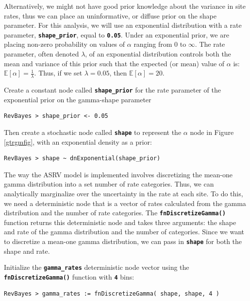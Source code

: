 \documentclass[11pt]{article}
\newcommand{\cl}[1]{{\texttt{\textbf{#1}}}}
\begin{document}
Alternatively, we might not have good prior knowledge about the variance in site rates, thus we can place an uninformative, or diffuse prior on the shape parameter.
For this analysis, we will use an exponential distribution with a rate parameter, \cl{shape\_prior}, equal to \cl{0.05}.
Under an exponential prior, we are placing non-zero probability on values of $\alpha$ ranging from 0 to $\infty$. 
The rate parameter, often denoted $\lambda$, of an exponential distribution controls both the mean and variance of this prior such that the expected (or mean) value of $\alpha$ is:
$\mathbb{E}[\alpha] = \frac{1}{\lambda}.$
Thus, if we set $\lambda=0.05$, then $\mathbb{E}[\alpha] = 20$.

Create a constant node called \cl{shape\_prior} for the rate parameter of the exponential prior on the gamma-shape parameter
{\tt\begin{snugshade*}
\begin{lstlisting}
RevBayes > shape_prior <- 0.05                                                                             
\end{lstlisting}
\end{snugshade*}}

Then create a stochastic node called \cl{shape} to represent the $\alpha$ node in Figure \ref{gtrgmfig}, with an exponential density as a prior:
{\tt\begin{snugshade*}
\begin{lstlisting}
RevBayes > shape ~ dnExponential(shape_prior)

\end{lstlisting}
\end{snugshade*}}

The way the ASRV model is implemented involves discretizing the mean-one gamma distribution into a set number of rate categories. Thus, we can analytically marginalize over the uncertainty in the rate at each site. To do this, we need a deterministic node that is a vector of rates calculated from the gamma distribution and the number of rate categories. The \cl{fnDiscretizeGamma()} function returns this deterministic node and takes three arguments: the shape and rate of the gamma distribution and the number of categories. Since we want to discretize a mean-one gamma distribution, we can pass in \cl{shape} for both the shape and rate.

Initialize the \cl{gamma\_rates} deterministic node vector using the  \cl{fnDiscretizeGamma()} function with \cl{4} bins:
{\tt \begin{snugshade*}
\begin{lstlisting}
RevBayes > gamma_rates := fnDiscretizeGamma( shape, shape, 4 )
\end{lstlisting}
\end{snugshade*}}
\end{document}
